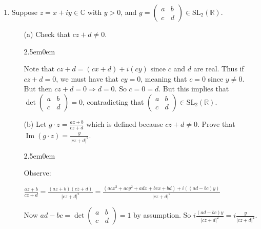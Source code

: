\documentclass{book}
\newcommand{\exOne}{%
   \color{Purple}%
   \fontsize{13}{15}\selectfont%
}
\newenvironment{myIndent}{%
   \begin{adjustwidth}{2.5em}{0em}%
}{%
   \end{adjustwidth}%
}
\DeclareMathOperator{\ima}{Im}
\newcommand{\retTwo}{\hfill\bigbreak}
\begin{document}
\begin{enumerate}
	\item Suppose $z = x + iy \in \mathbb{C}$ with $y > 0$, and $g = \left(
	\begin{smallmatrix}
		a & b \\ c & d
	\end{smallmatrix}\right) \in \mathrm{SL}_2(\mathbb{R})$.
	\begin{enumerate}
		\item[(a)] Check that $cz + d \neq 0$.
		
		\begin{myIndent}\exOne
			Note that $cz + d = (cx + d) + i(cy)$ since $c$ and $d$ are real. Thus if $cz + d = 0$, we must have that $cy = 0$, meaning that $c = 0$ since $y \neq 0$. But then $cz + d = 0 \Rightarrow d = 0$. So $c = 0 = d$. But this implies that $\det\left(
				\begin{smallmatrix}
					a & b \\ c & d
				\end{smallmatrix}\right) = 0$, contradicting that $\left(
					\begin{smallmatrix}
						a & b \\ c & d
					\end{smallmatrix}\right) \in \mathrm{SL}_2(\mathbb{R})$.
			\retTwo
		\end{myIndent}

		\item[(b)] Let $g \cdot z = \frac{az+b}{cz+d}$ which is defined because $cz + d \neq 0$. Prove that\\ $\ima(g \cdot z) = \frac{y}{|cz + d|^2}$.
		\begin{myIndent}\exOne
			Observe:

			{\centering $\frac{az + b}{cz + d} = \frac{(az + b)(c\overline{z} + d)}{|cz + d|^2} = \frac{(acx^2 + acy^2 + adx + bcx + bd) + i((ad-bc)y)}{|cz + d|^2}$\retTwo\par}

			Now $ad - bc = \det\left(
				\begin{smallmatrix}
					a & b \\ c & d
				\end{smallmatrix}\right) = 1$ by assumption. So $i\frac{(ad-bc)y}{|cz + d|^2} = i\frac{y}{|cz + d|^2}$.\retTwo


\end{myIndent}
\end{enumerate}
\end{enumerate}
\end{document}
